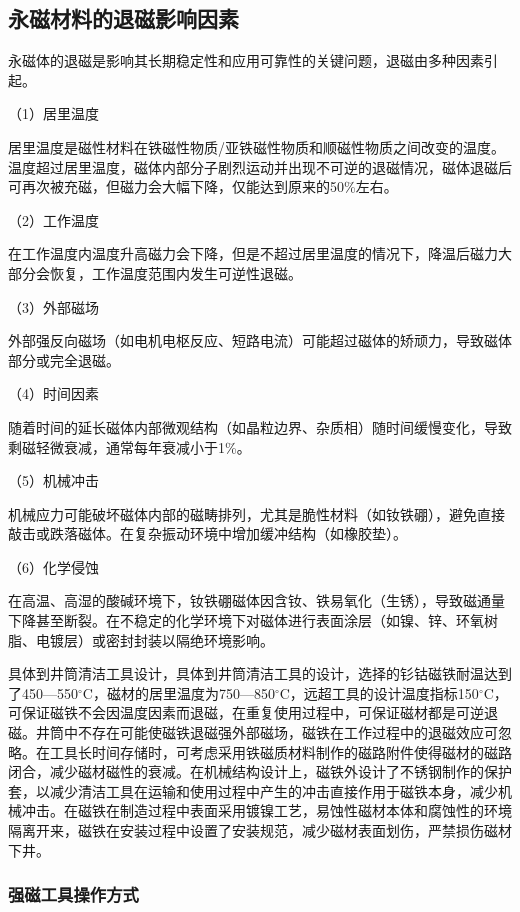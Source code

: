 \subsection{永磁材料的退磁影响因素}

永磁体的退磁是影响其长期稳定性和应用可靠性的关键问题，退磁由多种因素引起。

（1）居里温度

居里温度是磁性材料在铁磁性物质/亚铁磁性物质和顺磁性物质之间改变的温度。温度超过居里温度，磁体内部分子剧烈运动并出现不可逆的退磁情况，磁体退磁后可再次被充磁，但磁力会大幅下降，仅能达到原来的50\%左右。

（2）工作温度

在工作温度内温度升高磁力会下降，但是不超过居里温度的情况下，降温后磁力大部分会恢复，工作温度范围内发生可逆性退磁。

（3）外部磁场

外部强反向磁场（如电机电枢反应、短路电流）可能超过磁体的矫顽力，导致磁体部分或完全退磁。

（4）时间因素

随着时间的延长磁体内部微观结构（如晶粒边界、杂质相）随时间缓慢变化，导致剩磁轻微衰减，通常每年衰减小于1\%。

（5）机械冲击

机械应力可能破坏磁体内部的磁畴排列，尤其是脆性材料（如钕铁硼），避免直接敲击或跌落磁体。在复杂振动环境中增加缓冲结构（如橡胶垫）。

（6）化学侵蚀

在高温、高湿的酸碱环境下，钕铁硼磁体因含钕、铁易氧化（生锈），导致磁通量下降甚至断裂。在不稳定的化学环境下对磁体进行表面涂层（如镍、锌、环氧树脂、电镀层）或密封封装以隔绝环境影响。

具体到井筒清洁工具设计，具体到井筒清洁工具的设计，选择的钐钴磁铁耐温达到了450—550$^\circ$C，磁材的居里温度为750—850$^\circ$C，远超工具的设计温度指标150$^\circ$C，可保证磁铁不会因温度因素而退磁，在重复使用过程中，可保证磁材都是可逆退磁。井筒中不存在可能使磁铁退磁强外部磁场，磁铁在工作过程中的退磁效应可忽略。在工具长时间存储时，可考虑采用铁磁质材料制作的磁路附件使得磁材的磁路闭合，减少磁材磁性的衰减。在机械结构设计上，磁铁外设计了不锈钢制作的保护套，以减少清洁工具在运输和使用过程中产生的冲击直接作用于磁铁本身，减少机械冲击。在磁铁在制造过程中表面采用镀镍工艺，易蚀性磁材本体和腐蚀性的环境隔离开来，磁铁在安装过程中设置了安装规范，减少磁材表面划伤，严禁损伤磁材下井。

\subsubsection{强磁工具操作方式}

